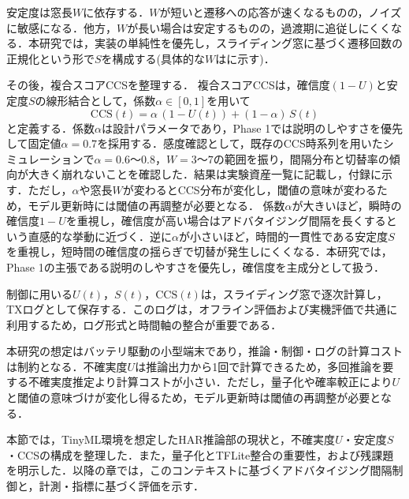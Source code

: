 安定度は窓長$W$に依存する．$W$が短いと遷移への応答が速くなるものの，ノイズに敏感になる．他方，$W$が長い場合は安定するものの，過渡期に追従しにくくなる．本研究では，実装の単純性を優先し，スライディング窓に基づく遷移回数の正規化という形で$S$を構成する(具体的な$W$はに示す)．

その後，複合スコアCCSを整理する．
複合スコアCCSは，確信度$(1-U)$と安定度$S$の線形結合として，係数$\alpha\in[0,1]$を用いて
\begin{equation}
  \mathrm{CCS}(t)=\alpha\,(1-U(t))+(1-\alpha)\,S(t)
\end{equation}
と定義する．係数$\alpha$は設計パラメータであり，Phase 1では説明のしやすさを優先して固定値$\alpha=0.7$を採用する．感度確認として，既存のCCS時系列を用いたシミュレーションで$\alpha=0.6$〜$0.8$，$W=3$〜$7$の範囲を振り，間隔分布と切替率の傾向が大きく崩れないことを確認した．結果は実験資産一覧に記載し，付録に示す．ただし，$\alpha$や窓長$W$が変わるとCCS分布が変化し，閾値の意味が変わるため，モデル更新時には閾値の再調整が必要となる．
係数$\alpha$が大きいほど，瞬時の確信度$1-U$を重視し，確信度が高い場合はアドバタイジング間隔を長くするという直感的な挙動に近づく．逆に$\alpha$が小さいほど，時間的一貫性である安定度$S$を重視し，短時間の確信度の揺らぎで切替が発生しにくくなる．本研究では，Phase 1の主張である説明のしやすさを優先し，確信度を主成分として扱う．

制御に用いる$U(t)$，$S(t)$，$\mathrm{CCS}(t)$は，スライディング窓で逐次計算し，TXログとして保存する．このログは，オフライン評価および実機評価で共通に利用するため，ログ形式と時間軸の整合が重要である．

本研究の想定はバッテリ駆動の小型端末であり，推論・制御・ログの計算コストは制約となる．不確実度$U$は推論出力から1回で計算できるため，多回推論を要する不確実度推定より計算コストが小さい．ただし，量子化や確率較正により$U$と閾値の意味づけが変化し得るため，モデル更新時は閾値の再調整が必要となる．

本節では，TinyML環境を想定したHAR推論部の現状と，不確実度$U$・安定度$S$・CCSの構成を整理した．また，量子化とTFLite整合の重要性，および残課題を明示した．以降の章では，このコンテキストに基づくアドバタイジング間隔制御と，計測・指標に基づく評価を示す．






















